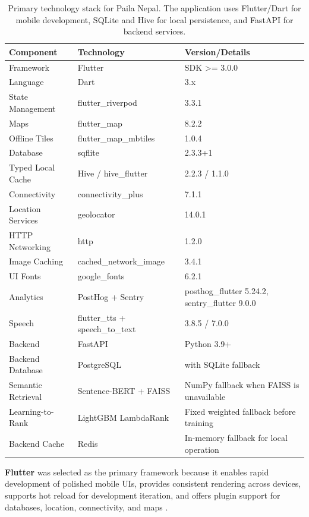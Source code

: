\documentclass[12pt,a4paper,oneside]{report}
\begin{document}
\begin{table}[h]
\centering
\small
\begin{tabular}{lll}
\toprule
\textbf{Component} & \textbf{Technology} & \textbf{Version/Details} \\
\midrule
Framework & Flutter & SDK >= 3.0.0 \\
Language & Dart & 3.x \\
State Management & flutter\_riverpod & 3.3.1 \\
Maps & flutter\_map & 8.2.2 \\
Offline Tiles & flutter\_map\_mbtiles & 1.0.4 \\
Database & sqflite & 2.3.3+1 \\
Typed Local Cache & Hive / hive\_flutter & 2.2.3 / 1.1.0 \\
Connectivity & connectivity\_plus & 7.1.1 \\
Location Services & geolocator & 14.0.1 \\
HTTP Networking & http & 1.2.0 \\
Image Caching & cached\_network\_image & 3.4.1 \\
UI Fonts & google\_fonts & 6.2.1 \\
Analytics & PostHog + Sentry & posthog\_flutter 5.24.2, sentry\_flutter 9.0.0 \\
Speech & flutter\_tts + speech\_to\_text & 3.8.5 / 7.0.0 \\
Backend & FastAPI & Python 3.9+ \\
Backend Database & PostgreSQL & with SQLite fallback \\
Semantic Retrieval & Sentence-BERT + FAISS & NumPy fallback when FAISS is unavailable \\
Learning-to-Rank & LightGBM LambdaRank & Fixed weighted fallback before training \\
Backend Cache & Redis & In-memory fallback for local operation \\
\bottomrule
\end{tabular}
\caption{Primary technology stack for Paila Nepal. The application uses Flutter/Dart for mobile development, SQLite and Hive for local persistence, and FastAPI for backend services.}
\label{tbl:tech_stack}
\end{table}

\textbf{Flutter} was selected as the primary framework because it enables rapid development of polished mobile UIs, provides consistent rendering across devices, supports hot reload for development iteration, and offers plugin support for databases, location, connectivity, and maps \parencite{Flutter2026}.
\end{document}
